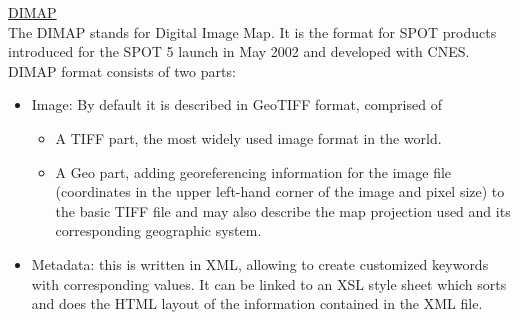 \documentclass[11pt]{article}
\begin{document}
\noindent \underline{DIMAP}\\
The DIMAP stands for Digital Image Map. It is the format for SPOT products introduced for the SPOT 5 launch in May 2002 and developed with CNES.\footnotemark \\
DIMAP format consists of two parts:\footnotemark[\value{footnote}]
\begin{itemize}
\item Image: By default it is described in GeoTIFF format, comprised of
\begin{itemize}
\item A TIFF part, the most widely used image format in the world.
\item A Geo part, adding georeferencing information for the image file (coordinates in the upper left-hand corner of the image and pixel size) to the basic TIFF file and may also describe the map projection used and its corresponding geographic system.
\end{itemize}
\item Metadata: this is written in XML, allowing to create customized keywords with corresponding values. It can be linked to an XSL style sheet which sorts and does the HTML layout of the information contained in the XML file.
\end{itemize}
\end{document}
